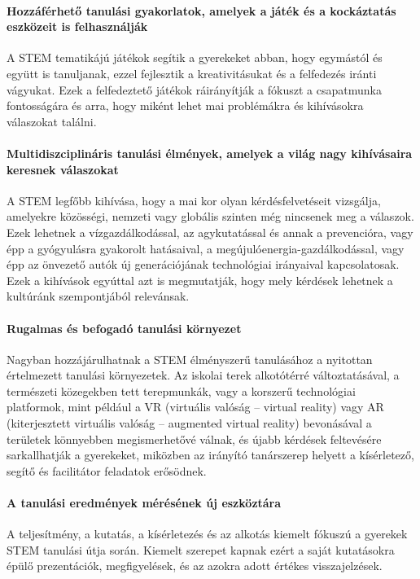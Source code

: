 \paragraph{Hozzáférhető tanulási gyakorlatok, amelyek a játék és a kockáztatás eszközeit is felhasználják} A STEM tematikájú játékok segítik a gyerekeket
abban, hogy egymástól és együtt is tanuljanak, ezzel fejlesztik a kreativitásukat és a felfedezés iránti vágyukat. Ezek a felfedeztető játékok ráirányítják a fókuszt a csapatmunka fontosságára és arra, hogy miként lehet mai problémákra és kihívásokra válaszokat találni.

\paragraph{Multidiszciplináris tanulási élmények, amelyek a világ nagy kihívásaira keresnek válaszokat} A STEM legfőbb kihívása, hogy a mai kor olyan
kérdésfelvetéseit vizsgálja, amelyekre közösségi, nemzeti vagy globális szinten még nincsenek meg a válaszok. Ezek lehetnek a vízgazdálkodással, az agykutatással és annak a prevencióra, vagy épp a gyógyulásra gyakorolt hatásaival, a megújulóenergia-gazdálkodással, vagy épp az önvezető autók új generációjának technológiai irányaival kapcsolatosak. Ezek a kihívások egyúttal azt is megmutatják, hogy mely kérdések lehetnek a kultúránk szempontjából relevánsak.

\paragraph{Rugalmas és befogadó tanulási környezet} Nagyban hozzájárulhatnak a
STEM élményszerű tanulásához a nyitottan értelmezett tanulási környezetek. Az iskolai terek alkotótérré változtatásával, a természeti közegekben tett terepmunkák, vagy a korszerű technológiai platformok, mint például a VR (virtuális valóság – virtual reality) vagy AR (kiterjesztett virtuális valóság – augmented virtual reality) bevonásával a területek könnyebben megismerhetővé válnak, és újabb kérdések feltevésére sarkallhatják a gyerekeket, miközben az irányító tanárszerep helyett a kísérletező, segítő és facilitátor feladatok erősödnek.

\paragraph{A tanulási eredmények mérésének új eszköztára} A teljesítmény, a
kutatás, a kísérletezés és az alkotás kiemelt fókuszú a gyerekek STEM tanulási útja során. Kiemelt szerepet kapnak ezért a saját kutatásokra épülő prezentációk, megfigyelések, és az azokra adott értékes visszajelzések.

